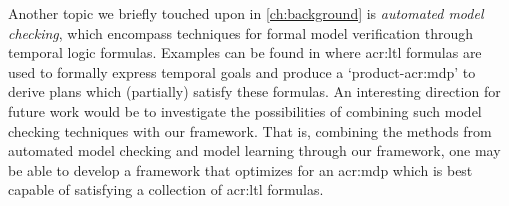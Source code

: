 Another topic we briefly touched upon in \autoref{ch:background} is \textit{automated model checking}, which encompass techniques for formal model verification through temporal logic formulas.
Examples can be found in \cite{bhatia2010sampling, lacerda2015optimal} where \acrshort{acr:ltl} formulas are used to formally express temporal goals and produce a `product-\acrshort{acr:mdp}' to derive plans which (partially) satisfy these formulas.
An interesting direction for future work would be to investigate the possibilities of combining such model checking techniques with our framework.
That is, combining the methods from automated model checking and model learning through our framework, one may be able to develop a framework that optimizes for an \acrshort{acr:mdp} which is best capable of satisfying a collection of \acrshort{acr:ltl} formulas.



